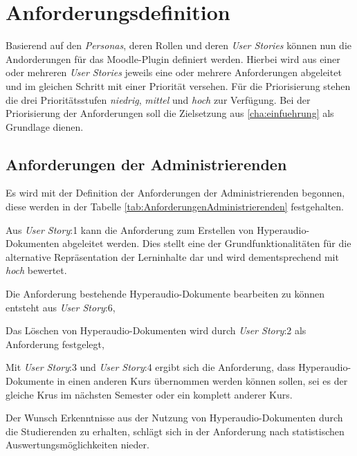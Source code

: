 \section{Anforderungsdefinition}
\label{sec:anforderungsdefinition}
Basierend auf den \textit{Personas}, deren Rollen und deren \textit{User Stories} können nun die Andorderungen für das Moodle-Plugin definiert werden. Hierbei wird aus einer oder mehreren \textit{User Stories} jeweils eine oder mehrere Anforderungen abgeleitet und im gleichen Schritt mit einer Priorität versehen. Für die Priorisierung stehen die drei Prioritätsstufen \textit{niedrig}, \textit{mittel} und \textit{hoch} zur Verfügung. Bei der Priorisierung der Anforderungen soll die Zielsetzung aus \ref{cha:einfuehrung} als Grundlage dienen.

\subsection{Anforderungen der Administrierenden}
Es wird mit der Definition der Anforderungen der Administrierenden begonnen, diese werden in der Tabelle \ref{tab:AnforderungenAdministrierenden} festgehalten.

Aus \textit{User Story}:1 kann die Anforderung zum Erstellen von Hyperaudio-Dokumenten abgeleitet werden. Dies stellt eine der Grundfunktionalitäten für die alternative Repräsentation der Lerninhalte dar und wird dementsprechend mit \textit{hoch} bewertet.

Die Anforderung bestehende Hyperaudio-Dokumente bearbeiten zu können entsteht aus \textit{User Story}:6,  

Das Löschen von Hyperaudio-Dokumenten wird durch \textit{User Story}:2 als Anforderung festgelegt,

Mit \textit{User Story}:3 und \textit{User Story}:4 ergibt sich die Anforderung, dass Hyperaudio-Dokumente in einen anderen Kurs übernommen werden können sollen, sei es der gleiche Krus im nächsten Semester oder ein komplett anderer Kurs.

Der Wunsch Erkenntnisse aus der Nutzung von Hyperaudio-Dokumenten durch die Studierenden zu erhalten, schlägt sich in der Anforderung nach statistischen Auswertungsmöglichkeiten nieder.

